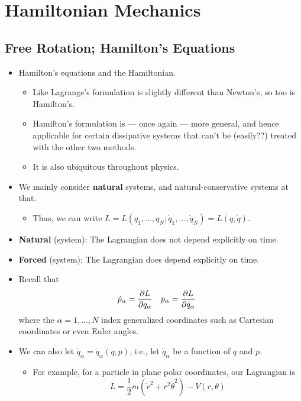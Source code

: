 \documentclass[../notes.tex]{subfiles}
\begin{document}
\chapter{Hamiltonian Mechanics}
\section{Free Rotation; Hamilton's Equations}
\begin{itemize}
    \item {}Hamilton's equations and the Hamiltonian.
    \begin{itemize}
        \item Like Lagrange's formulation is slightly different than Newton's, so too is Hamilton's.
        \item Hamilton's formulation is --- once again --- more general, and hence applicable for certain dissipative systems that can't be (easily??) treated with the other two methods.
        \item It is also ubiquitous throughout physics.
    \end{itemize}
    \item We mainly consider \textbf{natural} systems, and natural-conservative systems at that.
    \begin{itemize}
        \item Thus, we can write $L=L(q_1,\dots,q_N;\dot{q}_1,\dots,\dot{q}_N)=L(q,\dot{q})$.
    \end{itemize}
    \item \textbf{Natural} (system): The Lagrangian does not depend explicitly on time.
    \item \textbf{Forced} (system): The Lagrangian does depend explicitly on time.
    \item Recall that
    \begin{align*}
        \dot{p}_\alpha &= \pdv{L}{q_\alpha}&
        p_\alpha &= \pdv{L}{\dot{q}_\alpha}
    \end{align*}
    where the $\alpha=1,\dots,N$ index generalized coordinates such as Cartesian coordinates or even Euler angles.
    \item We can also let $\dot{q}_\alpha=\dot{q}_\alpha(q,p)$, i.e., let $\dot{q}_\alpha$ be a function of $q$ and $p$.
    \begin{itemize}
        \item For example, for a particle in plane polar coordinates, our Lagrangian is
        \begin{equation*}
            L = \frac{1}{2}m(\dot{r}^2+r^2\dot{\theta}^2)-V(r,\theta)

\end{equation*}
\end{itemize}
\end{itemize}
\end{document}
